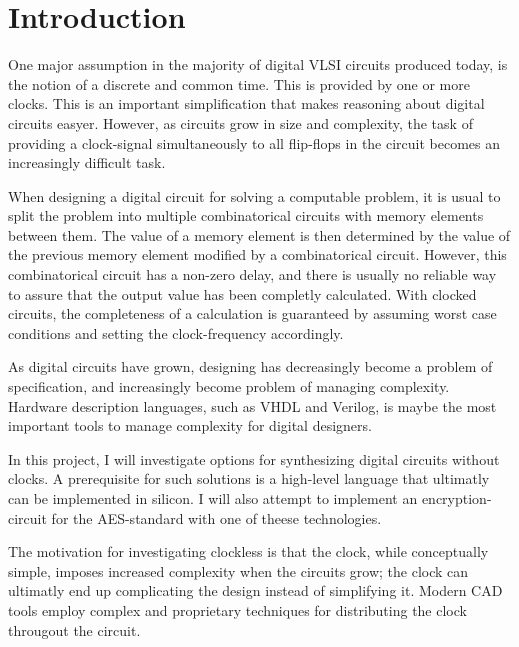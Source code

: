 \section{Introduction}

One major assumption in the majority of digital VLSI circuits produced
today, is the notion of a discrete and common time. This is provided
by one or more clocks. This is an important simplification that makes
reasoning about digital circuits easyer. However, as circuits grow in
size and complexity, the task of providing a clock-signal
simultaneously to all flip-flops in the circuit becomes an
increasingly difficult task.

When designing a digital circuit for solving a computable problem, it
is usual to split the problem into multiple combinatorical circuits
with memory elements between them. The value of a memory element is
then determined by the value of the previous memory element modified
by a combinatorical circuit. However, this combinatorical circuit has
a non-zero delay, and there is usually no reliable way to assure that
the output value has been completly calculated. With clocked circuits,
the completeness of a calculation is guaranteed by assuming worst case
conditions and setting the clock-frequency accordingly.

As digital circuits have grown, designing has decreasingly become a
problem of specification, and increasingly become problem of managing
complexity. Hardware description languages, such as VHDL and Verilog,
is maybe the most important tools to manage complexity for digital
designers.

In this project, I will investigate options for synthesizing digital
circuits without clocks. A prerequisite for such solutions is a
high-level language that ultimatly can be implemented in silicon. I
will also attempt to implement an encryption-circuit for the
AES-standard with one of theese technologies.

The motivation for investigating clockless is that the clock, while
conceptually simple, imposes increased complexity when the circuits
grow; the clock can ultimatly end up complicating the design instead
of simplifying it. Modern CAD tools employ complex and proprietary
techniques for distributing the clock througout the circuit.

